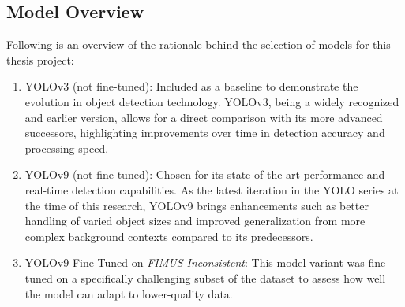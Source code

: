 \subsection{Model Overview}
\label{sec:model_presentation}
Following is an overview of the rationale behind the selection of models for this thesis project:
\begin{enumerate}
    \item YOLOv3 (not fine-tuned): Included as a baseline to demonstrate the evolution in object detection technology. YOLOv3, being a widely recognized and earlier version, allows for a direct comparison with its more advanced successors, highlighting improvements over time in detection accuracy and processing speed.
    \item YOLOv9 (not fine-tuned): Chosen for its state-of-the-art performance and real-time detection capabilities. As the latest iteration in the YOLO series at the time of this research, YOLOv9 brings enhancements such as better handling of varied object sizes and improved generalization from more complex background contexts compared to its predecessors.
    \item YOLOv9 Fine-Tuned on \textit{FIMUS Inconsistent}: This model variant was fine-tuned on a specifically challenging subset of the dataset to assess how well the model can adapt to lower-quality data.
    

\end{enumerate}
